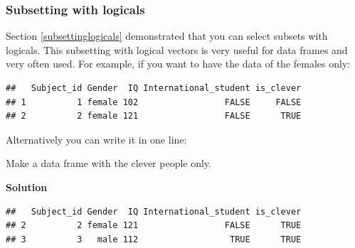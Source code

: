 \documentclass[
]{scrartcl}
\makeatletter
\newenvironment{Shaded}{\begin{snugshade}}{\end{snugshade}}
\newcommand{\CommentTok}[1]{\textcolor[rgb]{0.56,0.35,0.01}{\textit{#1}}}
\newcommand{\NormalTok}[1]{#1}
\newcommand{\OtherTok}[1]{\textcolor[rgb]{0.56,0.35,0.01}{#1}}
\newcommand{\SpecialCharTok}[1]{\textcolor[rgb]{0.81,0.36,0.00}{\textbf{#1}}}
\newcommand{\StringTok}[1]{\textcolor[rgb]{0.31,0.60,0.02}{#1}}
\newenvironment{kframe}{%
\medskip{}
\setlength{\fboxsep}{.8em}
 \def\at@end@of@kframe{}%
 \ifinner\ifhmode%
  \def\at@end@of@kframe{\end{minipage}}%
  \begin{minipage}{\columnwidth}%
 \fi\fi%
 \def\FrameCommand##1{\hskip\@totalleftmargin \hskip-\fboxsep
 \colorbox{shadecolor}{##1}\hskip-\fboxsep
     \hskip-\linewidth \hskip-\@totalleftmargin \hskip\columnwidth}%
 \MakeFramed {\advance\hsize-\width
   \@totalleftmargin\z@ \linewidth\hsize
   \@setminipage}}%
 {\par\unskip\endMakeFramed%
 \at@end@of@kframe}
\newenvironment{rmdblock}[1]
  {
  \begin{itemize}
  \renewcommand{\labelitemi}{
    \raisebox{-.7\height}[0pt][0pt]{
      {\setkeys{Gin}{width=3em,keepaspectratio}\texttt{[image: images/\#1]}}
    }
  }
  \setlength{\fboxsep}{1em}
  \begin{kframe}
  \item
  }
  {
  \end{kframe}
  \end{itemize}
  }
\newenvironment{myexercise}
    {\begin{rmdblock}{exercise_green}}
    {\end{rmdblock}}
\newenvironment{webexsolution}[1]
    {\par\tiny\textbf{#1}}
    {\par}
\newcommand{\webexhide}[1]{\begin{webexsolution}{#1}}
\newcommand{\webexunhide}{\end{webexsolution}}
\makeatother
\begin{document}
\webexunhide

\subsubsection{Subsetting with logicals}\label{subsettinglogicalsdataframe}

Section \ref{subsettinglogicals} demonstrated that you can select subsets with logicals. This subsetting with logical vectors is very useful for data frames and very often used. For example, if you want to have the data of the females only:

\begin{Shaded}
\end{Shaded}

\begin{verbatim}
##   Subject_id Gender  IQ International_student is_clever
## 1          1 female 102                 FALSE     FALSE
## 2          2 female 121                 FALSE      TRUE
\end{verbatim}

Alternatively you can write it in one line:

\begin{Shaded}
\end{Shaded}

\begin{myexercise}
Make a data frame with the clever people only.
\end{myexercise}
\webexhide{Solution}

\begin{Shaded}
\end{Shaded}

\begin{verbatim}
##   Subject_id Gender  IQ International_student is_clever
## 2          2 female 121                 FALSE      TRUE
## 3          3   male 112                  TRUE      TRUE
\end{verbatim}
\end{document}
